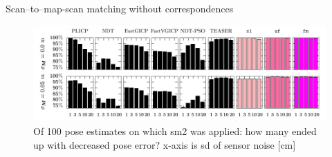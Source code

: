 \begin{frame}{Scan--to--map-scan matching without correspondences}

\begin{figure}\centering
  \includegraphics[scale=0.4]{figures/09/pose_improvement_percent.png}
  \caption{Of 100 pose estimates on which sm2 was applied: how many ended
    up with decreased pose error? x-axis is sd of sensor noise [cm]}
\end{figure}

\end{frame}
